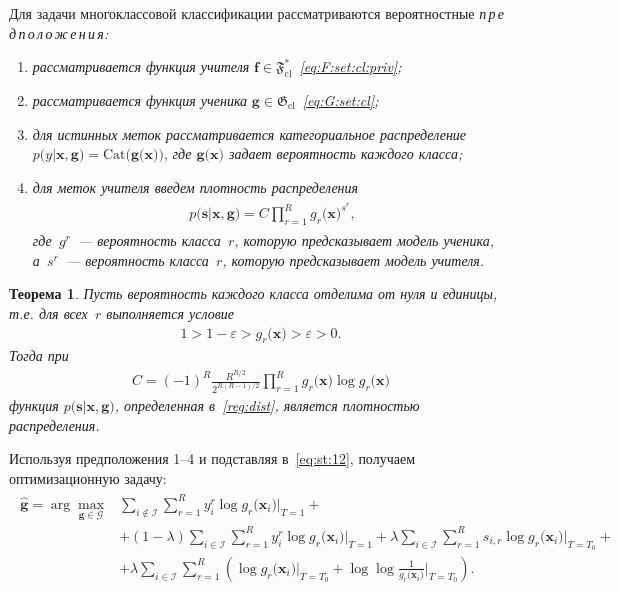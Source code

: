 \documentclass{dissert}
\newtheorem{theorem}{Теорема}
\begin{document}
Для задачи многоклассовой классификации рассматриваются вероятностные 
{\sl{п\,р\,е\,д\,п\,о\,л\,о\,ж\,е\,н\,и\,я:}}
\begin{enumerate}[1)]
\label{st:class:1}
	\item \emph{рассматривается функция учителя} $\mathbf{f}\in\mathfrak{F}_{\text{cl}}^{*}$~\emph{\eqref{eq:F:set:cl:priv};}
	\item \emph{рассматривается функция ученика}   $\mathbf{g}\in\mathfrak{G}_{\text{cl}}$~\emph{\eqref{eq:G:set:cl};}
	\item \emph{для истинных меток рассматривается категориальное распределение}~$p\bigr(y|\mathbf{x}, \mathbf{g}\bigr) = \text{Cat}\bigr(\mathbf{g}\bigr(\mathbf{x}\bigr)\bigr)$, \emph{где $\mathbf{g}\bigr(\mathbf{x}\bigr)$ задает вероятность каждого класса;}
	\item \emph{для меток учителя введем плотность распределения}
\begin{gather}
\label{reg:dist}
\begin{aligned}
	p\bigr(\mathbf{s}|\mathbf{x}, \mathbf{g}\bigr) = C\prod_{r=1}^{R}g_r\bigr(\mathbf{x}\bigr)^{s^r},
\end{aligned}
\end{gather}
\emph{где~$g^r$~--- вероятность класса~$r$, которую предсказывает модель ученика, а~$s^r$~--- вероятность класса~$r$, которую предсказывает модель учителя.}
\end{enumerate}
\begin{theorem}
\label{theorem:st:dist}
Пусть вероятность каждого класса отделима от нуля и единицы, т.е. для всех~$r$ выполняется условие
\begin{gather}
1 > 1- \varepsilon > g_r\bigr(\mathbf{x}\bigr) > \varepsilon > 0.
\end{gather}
Тогда при
\begin{gather}
C=\left(-1\right)^{R}\frac{R^{R/2}}{2^{R(R-1)/2}}\prod_{r=1}^{R}g_r\bigr(\mathbf{x}\bigr)\log g_r\bigr(\mathbf{x}\bigr)
\end{gather}
функция $p\bigr(\mathbf{s}|\mathbf{x}, \mathbf{g}\bigr)$, определенная в~\eqref{reg:dist}, является плотностью распределения.
\end{theorem}

Используя предположения 1--4 и подставляя в~\eqref{eq:st:12}, получаем  оптимизационную задачу:
\begin{gather}
\label{eq:st:class:1}
\begin{aligned}
\hat{\mathbf{g}} = \arg\max_{\mathbf{g}\in \mathcal{G}} & \sum_{i\not\in \mathcal{I}}\sum_{r=1}^{R}y_i^r\log g_r\bigr(\mathbf{x}_i\bigr)\bigr|_{T=1} +\\
&+ \left(1-\lambda\right)\sum_{i\in \mathcal{I}}\sum_{r=1}^{R}y_i^r\log g_r\bigr(\mathbf{x}_i\bigr)\bigr|_{T=1} + \lambda\sum_{i\in \mathcal{I}}\sum_{r=1}^{R}s_{i,r}\log g_r\bigr(\mathbf{x}_i\bigr)\bigr|_{T=T_0} +\\
&+ \lambda \sum_{i\in \mathcal{I}}\sum_{r=1}^{R}\left(\log g_r\bigr(\mathbf{x}_i\bigr)\bigr|_{T=T_0} + \log\log\frac{1}{g_r\bigr(\mathbf{x}_i\bigr)}\bigr|_{T=T_0}\right).
\end{aligned}
\end{gather}
\end{document}
